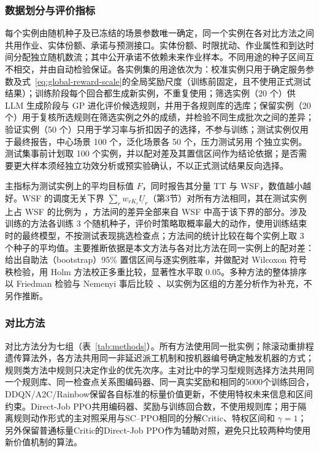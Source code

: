 \subsubsection{数据划分与评价指标}

每个实例由随机种子及已冻结的场景参数唯一确定，同一个实例在各对比方法之间共用作业、实体份额、承诺与预测接口。实体份额、时限扰动、作业属性和到达时间分配独立随机数流；其中公开承诺不依赖未来作业样本。不同用途的种子区间互不相交，并由自动检验保证。各实例集的用途依次为：校准实例只用于确定服务参数及式~\eqref{eq:global-reward-scale}的全局奖励尺度（训练前固定，且不使用正式测试结果）；训练阶段每个回合都生成新实例，不重复使用；筛选实例（20 个）供 LLM 生成阶段与 GP 进化评价候选规则，并用于各规则库的选库；保留实例（20 个）用于复核所选规则在筛选实例之外的成绩，并检验不同生成批次之间的差异；验证实例（50 个）只用于学习率与折扣因子的选择，不参与训练；测试实例仅用于最终报告，中心场景 100 个，泛化场景各 50 个，压力测试另用 \tbd[30--50] 个独立实例。测试集事前计划取 100 个实例，并以配对差及其置信区间作为结论依据；是否需要更大样本须经独立功效分析或预实验确认，不以正式测试结果反向选择。

主指标为测试实例上的平均目标值 $F$，同时报告其分量 TT 与 WSF，数值越小越好。WSF 的调度无关下界 $\sum_r w_{rK_r}\underline{U}_r$（第3节）对所有方法相同，其在测试实例上占 WSF 的比例为 \tbd[※]，方法间的差异全部来自 WSF 中高于该下界的部分。涉及训练的方法各训练 3 个随机种子，评价时策略取概率最大的动作，使用训练结束时的最终模型，不按测试表现挑选检查点；方法间的统计比较在每个实例上取 3 个种子的平均值。主要推断依据是本文方法与各对比方法在同一实例上的配对差：给出自助法（bootstrap）95\% 置信区间与逐实例胜率，并做配对 Wilcoxon 符号秩检验，用 Holm 方法校正多重比较，显著性水平取 0.05。多种方法的整体排序以 Friedman 检验与 Nemenyi 事后比较~\cite{demsar2006}、以实例为区组的方差分析作为补充，不另作推断。

\subsubsection{对比方法}

对比方法分为七组（表~\ref{tab:methods}）。所有方法使用同一批实例；除滚动重排程遗传算法外，各方法共用同一非延迟派工机制和按机器编号确定触发机器的方式；规则类方法中规则只决定作业的优先次序。主对比中的学习型规则选择方法共用同一个规则库、同一检查点关系图编码器、同一真实奖励和相同的5000个训练回合，DDQN/A2C/Rainbow保留各自标准的标量价值更新，不使用特权未来信息和区间约束。Direct-Job PPO共用编码器、奖励与训练回合数，不使用规则库；用于隔离规则动作形式的主对照采用与SC--PPO相同的分解Critic、特权区间和 $\gamma=1$；另外保留普通标量Critic的Direct-Job PPO作为辅助对照，避免只比较两种均使用新价值机制的算法。

